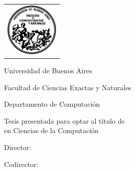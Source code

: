 \newcommand{\HRule}{\rule{\linewidth}{0.2mm}}
%
\thispagestyle{empty}

\begin{center}\leavevmode

\vspace{-2cm}

\begin{tabular}{l}
\includegraphics[width=2.6cm]{logofcen.pdf}
\end{tabular}


{\large \sc Universidad de Buenos Aires

Facultad de Ciencias Exactas y Naturales

Departamento de Computación}

\vspace{6.0cm}


{\huge\bf \tituloTesis}

\vspace{2cm}

{\large Tesis presentada para optar al título de\\
\titulo en Ciencias de la Computación}

\vspace{2cm}

{\Large \autor}

\end{center}

\vfill

{\large

{Director: \director}

\vspace{.2cm}

{Codirector: \codirector}

\vspace{.2cm}

\lugar
}

\newpage\thispagestyle{empty}
